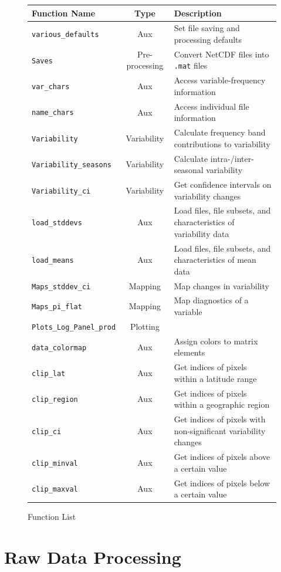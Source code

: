 \documentclass{article}
\begin{document}
\begin{figure}[h]
\caption{Function List}
\begin{center}
\begin{tabular}{l c | p{3.5in}}
Function Name&Type&Description\\ \hline
\texttt{various\_defaults}&Aux&Set file saving and processing defaults\\ 
\texttt{Saves}&Pre-processing&Convert NetCDF files into \texttt{.mat} files\\ 
\texttt{var\_chars}&Aux&Access variable-frequency information\\
\texttt{name\_chars}&Aux&Access individual file information\\ 
\texttt{Variability}&Variability&Calculate frequency band contributions to variability\\
\texttt{Variability\_seasons}&Variability&Calculate intra-/inter-seasonal variability\\
\texttt{Variability\_ci}&Variability&Get confidence intervals on variability changes\\
\texttt{load\_stddevs}&Aux&Load files, file subsets, and characteristics of variability data\\
\texttt{load\_means}&Aux&Load files, file subsets, and characteristics of mean data\\
\texttt{Maps\_stddev\_ci}&Mapping&Map changes in variability\\ 
\texttt{Maps\_pi\_flat}&Mapping&Map diagnostics of a variable\\
\texttt{Plots\_Log\_Panel\_prod}&Plotting& \\
\texttt{data\_colormap}&Aux&Assign colors to matrix elements\\
\texttt{clip\_lat}&Aux&Get indices of pixels within a latitude range\\
\texttt{clip\_region}&Aux&Get indices of pixels within a geographic region\\
\texttt{clip\_ci}&Aux&Get indices of pixels with non-significant variability changes\\
\texttt{clip\_minval}&Aux&Get indices of pixels above a certain value\\
\texttt{clip\_maxval}&Aux&Get indices of pixels below a certain value\\
\end{tabular}
\end{center}
\end{figure}


\section{Raw Data Processing} %
\end{document}
